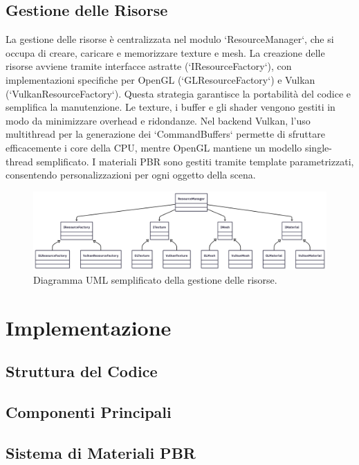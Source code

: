 \documentclass[12pt,a4paper,openright,twoside]{book}
\begin{document}
\section{Gestione delle Risorse}
La gestione delle risorse è centralizzata nel modulo `ResourceManager`, che si occupa di creare, caricare e memorizzare
texture e mesh. La creazione delle risorse avviene tramite interfacce astratte (`IResourceFactory`), con implementazioni
specifiche per OpenGL (`GLResourceFactory`) e Vulkan (`VulkanResourceFactory`). Questa strategia garantisce la portabilità
del codice e semplifica la manutenzione. Le texture, i buffer e gli shader vengono gestiti in modo da minimizzare
overhead e ridondanze. Nel backend Vulkan, l'uso multithread per la generazione dei `CommandBuffers` permette di
sfruttare efficacemente i core della CPU, mentre OpenGL mantiene un modello single-thread semplificato. I materiali PBR
sono gestiti tramite template parametrizzati, consentendo personalizzazioni per ogni oggetto della scena.
\begin{figure}[H]
    \centering
    \includegraphics[width=.8\linewidth]{figures/uml_resources.png}
    \caption{Diagramma UML semplificato della gestione delle risorse.}
    \label{fig:uml-resources}
\end{figure}

\chapter{Implementazione}
\label{chap:implementazione}

\section{Struttura del Codice}

\section{Componenti Principali}

\section{Sistema di Materiali PBR}
\end{document}
